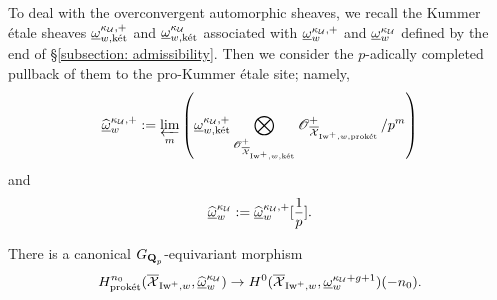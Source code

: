 To deal with the overconvergent automorphic sheaves, we recall the Kummer \'etale sheaves $\underline{\omega}^{\kappa_{\operatorname{\mathcal{U}}},+}_{w,\operatorname{\textrm{k\'{e}t}}}$ and $\underline{\omega}^{\kappa_{\operatorname{\mathcal{U}}}}_{w,\operatorname{\textrm{k\'{e}t}}}$ associated with $\underline{\omega}^{\kappa_{\operatorname{\mathcal{U}}},+}_{w}$ and $\underline{\omega}^{\kappa_{\operatorname{\mathcal{U}}}}_{w}$ defined by the end of \S \ref{subsection: admissibility}. Then we consider the $p$-adically completed pullback of them to the pro-Kummer \'etale site; namely,
\[
\widehat{\underline{\omega}}_{w}^{\kappa_{\operatorname{\mathcal{U}}},+}:=\varprojlim_m\left(\underline{\omega}^{\kappa_{\operatorname{\mathcal{U}}},+}_{w,\operatorname{\textrm{k\'{e}t}}}\bigotimes_{\operatorname{\mathscr{O}}^+_{\overline{\operatorname{\mathcal{X}}}_{\operatorname{Iw}^+, w,\operatorname{\textrm{k\'{e}t}}}}}\operatorname{\mathscr{O}}^+_{\overline{\operatorname{\mathcal{X}}}_{\operatorname{Iw}^+, w, \operatorname{\textrm{prok\'{e}t}}}}/p^m\right)
\]
and \[\widehat{\underline{\omega}}_{w}^{\kappa_{\operatorname{\mathcal{U}}}}:=\widehat{\underline{\omega}}_{w}^{\kappa_{\operatorname{\mathcal{U}}},+}[\frac{1}{p}].\]

\begin{Lemma}\label{Lemma: Leray spectral sequence for the automorphic sheaf}
There is a canonical $G_{\operatorname{\mathbf{Q}}_p}$-equivariant morphism $$H_{\operatorname{\textrm{prok\'{e}t}}}^{n_0}(\overline{\operatorname{\mathcal{X}}}_{\operatorname{Iw}^+, w}, \widehat{\underline{\omega}}_w^{\kappa_{\operatorname{\mathcal{U}}}}) \rightarrow H^0(\overline{\operatorname{\mathcal{X}}}_{\operatorname{Iw}^+, w}, \underline{\omega}_w^{\kappa_{\operatorname{\mathcal{U}}}+g+1})(-n_0).$$
\end{Lemma}
